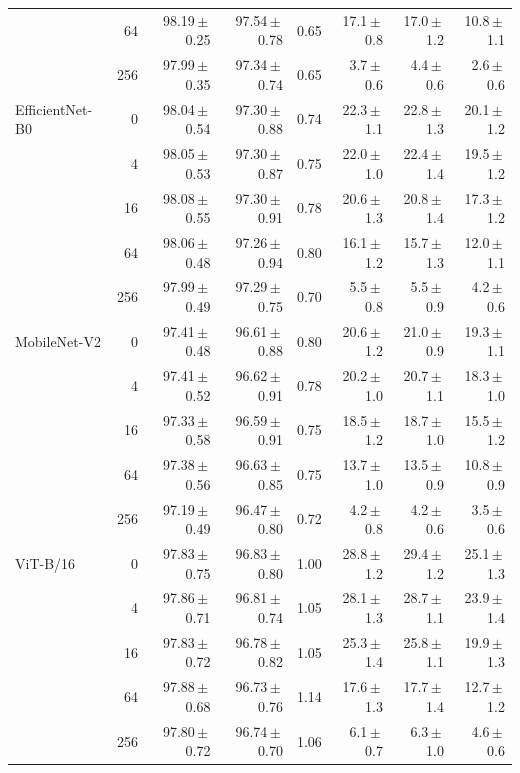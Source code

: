 {\begin{longtable}{lrrrrrrr}
 & 64 & 98.19\,$\pm$\,0.25 & 97.54\,$\pm$\,0.78 & 0.65 & 17.1\,$\pm$\,0.8 & 17.0\,$\pm$\,1.2 & 10.8\,$\pm$\,1.1 \\
 & 256 & 97.99\,$\pm$\,0.35 & 97.34\,$\pm$\,0.74 & 0.65 & 3.7\,$\pm$\,0.6 & 4.4\,$\pm$\,0.6 & 2.6\,$\pm$\,0.6 \\
EfficientNet-B0 & 0 & 98.04\,$\pm$\,0.54 & 97.30\,$\pm$\,0.88 & 0.74 & 22.3\,$\pm$\,1.1 & 22.8\,$\pm$\,1.3 & 20.1\,$\pm$\,1.2 \\
 & 4 & 98.05\,$\pm$\,0.53 & 97.30\,$\pm$\,0.87 & 0.75 & 22.0\,$\pm$\,1.0 & 22.4\,$\pm$\,1.4 & 19.5\,$\pm$\,1.2 \\
 & 16 & 98.08\,$\pm$\,0.55 & 97.30\,$\pm$\,0.91 & 0.78 & 20.6\,$\pm$\,1.3 & 20.8\,$\pm$\,1.4 & 17.3\,$\pm$\,1.2 \\
 & 64 & 98.06\,$\pm$\,0.48 & 97.26\,$\pm$\,0.94 & 0.80 & 16.1\,$\pm$\,1.2 & 15.7\,$\pm$\,1.3 & 12.0\,$\pm$\,1.1 \\
 & 256 & 97.99\,$\pm$\,0.49 & 97.29\,$\pm$\,0.75 & 0.70 & 5.5\,$\pm$\,0.8 & 5.5\,$\pm$\,0.9 & 4.2\,$\pm$\,0.6 \\
MobileNet-V2 & 0 & 97.41\,$\pm$\,0.48 & 96.61\,$\pm$\,0.88 & 0.80 & 20.6\,$\pm$\,1.2 & 21.0\,$\pm$\,0.9 & 19.3\,$\pm$\,1.1 \\
 & 4 & 97.41\,$\pm$\,0.52 & 96.62\,$\pm$\,0.91 & 0.78 & 20.2\,$\pm$\,1.0 & 20.7\,$\pm$\,1.1 & 18.3\,$\pm$\,1.0 \\
 & 16 & 97.33\,$\pm$\,0.58 & 96.59\,$\pm$\,0.91 & 0.75 & 18.5\,$\pm$\,1.2 & 18.7\,$\pm$\,1.0 & 15.5\,$\pm$\,1.2 \\
 & 64 & 97.38\,$\pm$\,0.56 & 96.63\,$\pm$\,0.85 & 0.75 & 13.7\,$\pm$\,1.0 & 13.5\,$\pm$\,0.9 & 10.8\,$\pm$\,0.9 \\
 & 256 & 97.19\,$\pm$\,0.49 & 96.47\,$\pm$\,0.80 & 0.72 & 4.2\,$\pm$\,0.8 & 4.2\,$\pm$\,0.6 & 3.5\,$\pm$\,0.6 \\
ViT-B/16 & 0 & 97.83\,$\pm$\,0.75 & 96.83\,$\pm$\,0.80 & 1.00 & 28.8\,$\pm$\,1.2 & 29.4\,$\pm$\,1.2 & 25.1\,$\pm$\,1.3 \\
 & 4 & 97.86\,$\pm$\,0.71 & 96.81\,$\pm$\,0.74 & 1.05 & 28.1\,$\pm$\,1.3 & 28.7\,$\pm$\,1.1 & 23.9\,$\pm$\,1.4 \\
 & 16 & 97.83\,$\pm$\,0.72 & 96.78\,$\pm$\,0.82 & 1.05 & 25.3\,$\pm$\,1.4 & 25.8\,$\pm$\,1.1 & 19.9\,$\pm$\,1.3 \\
 & 64 & 97.88\,$\pm$\,0.68 & 96.73\,$\pm$\,0.76 & 1.14 & 17.6\,$\pm$\,1.3 & 17.7\,$\pm$\,1.4 & 12.7\,$\pm$\,1.2 \\
 & 256 & 97.80\,$\pm$\,0.72 & 96.74\,$\pm$\,0.70 & 1.06 & 6.1\,$\pm$\,0.7 & 6.3\,$\pm$\,1.0 & 4.6\,$\pm$\,0.6 \\

\end{longtable}}
